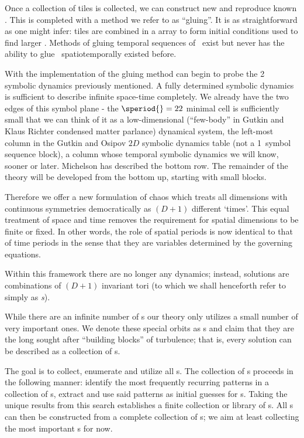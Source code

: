 Once a collection of tiles is collected, we can construct new and reproduce known \twots.
This is completed with a method we refer to as ``gluing''. It is as straightforward as one
might infer: tiles are combined in a {\spt} array to form initial conditions used to find larger
\twots. Methods of gluing temporal sequences of \twots\ exist but never has the ability to
glue \twots\ spatiotemporally existed before.

With the implementation of the gluing method can begin to
probe the 2\dmn\ {\spt} symbolic dynamics
previously mentioned. A fully determined symbolic dynamics is sufficient
to describe infinite space-time completely.
We already have the two edges of this symbol plane - the $\speriod{}=22$ minimal
cell is sufficiently small that we can think of it as
a low-dimensional (``few-body'' in Gutkin and Klaus
Richter condensed matter parlance)
dynamical system, the left-most column in the Gutkin and
Osipov $2D$ symbolic dynamics {\spt} table (not a
1\dmn\ symbol sequence block), a column whose temporal symbolic dynamics
we will know, sooner or later. Michelson has described the
bottom row. The remainder of the theory will be developed from the
bottom up, starting with small {\spt} blocks.



Therefore we offer a new {\spt} formulation of chaos which
treats all dimensions with continuous symmetries democratically as $(D+1)$ different `times'.
This equal treatment of space and time removes the requirement for
spatial dimensions to be finite or fixed. In other words,
the role of spatial periods is now identical to that of time periods
in the sense that they are
variables determined by the governing equations.

Within this framework there
are no longer any dynamics; instead, solutions are {\spt} combinations of
$(D+1)$ invariant tori (to which we shall henceforth refer to simply as \emph{{\po}s}).

While there are an infinite number of {\po}s our theory only utilizes a small
number of very important ones. We denote these special orbits as {\fpo}s and claim
that they are the long sought after ``building blocks''
of turbulence; that is, every solution can be described as a collection of {\fpo}s.

The goal is to collect, enumerate and utilize all {\fpo}s.
The collection of {\fpo}s proceeds in the following manner:
identify the most frequently recurring patterns in a collection of {\po}s,
extract and use said patterns as initial guesses for {\fpo}s. Taking the
unique results from this search establishes a finite collection or library
of {\fpo}s.
All {\po}s can then be constructed from a complete collection of {\fpo}s; we
aim at least collecting the most important {\fpo}s for now.
